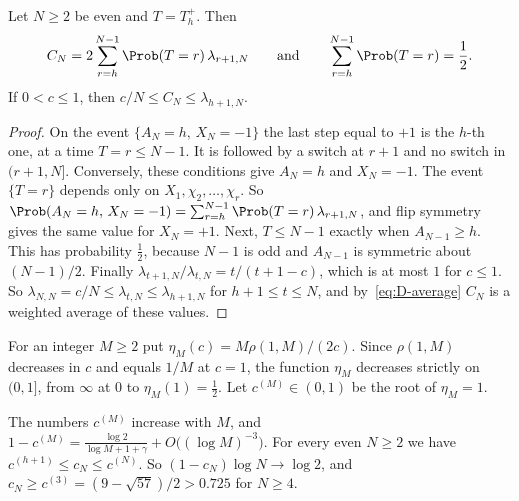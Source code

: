 \begin{lemma}\label{lem:D-average}
Let $N\ge2$ be even and $T=T^+_h$. Then
\begin{equation}\label{eq:D-average}
C_N=2\sum_{r=h}^{N-1}\Prob(T=r)\,\lambda_{r+1,N}\qquad\text{and}\qquad
\sum_{r=h}^{N-1}\Prob(T=r)=\frac12 .
\end{equation}
If $0<c\le1$, then $c/N\le C_N\le\lambda_{h+1,N}$.
\end{lemma}

\begin{proof}
On the event $\{A_N=h,\,X_N=-1\}$ the last step equal to $+1$ is the $h$-th
one, at a time $T=r\le N-1$. It is followed by a switch at $r+1$ and no switch
in $(r+1,N]$. Conversely, these conditions give $A_N=h$ and $X_N=-1$. The
event $\{T=r\}$ depends only on $X_1,\chi_2,\dots,\chi_r$. So
$\Prob(A_N=h,\,X_N=-1)=\sum_{r=h}^{N-1}\Prob(T=r)\,\lambda_{r+1,N}$, and flip
symmetry gives the same value for $X_N=+1$. Next, $T\le N-1$ exactly when
$A_{N-1}\ge h$. This has probability $\frac12$, because $N-1$ is odd and
$A_{N-1}$ is symmetric about $(N-1)/2$. Finally
$\lambda_{t+1,N}/\lambda_{t,N}=t/(t+1-c)$, which is at most $1$ for $c\le1$.
So $\lambda_{N,N}=c/N\le\lambda_{t,N}\le\lambda_{h+1,N}$ for
$h+1\le t\le N$, and by~\eqref{eq:D-average} $C_N$ is a weighted average of
these values.
\end{proof}

For an integer $M\ge2$ put $\eta_M(c)=M\rho(1,M)/(2c)$. Since $\rho(1,M)$
decreases in $c$ and equals $1/M$ at $c=1$, the function $\eta_M$ decreases
strictly on $(0,1]$, from $\infty$ at $0$ to $\eta_M(1)=\frac12$. Let
$c^{(M)}\in(0,1)$ be the root of $\eta_M=1$.

\begin{proposition}[bracket]\label{prop:D-bracket}
The numbers $c^{(M)}$ increase with $M$, and
$1-c^{(M)}=\frac{\log2}{\log M+1+\gamma}+O\bigl((\log M)^{-3}\bigr)$. For
every even $N\ge2$ we have $c^{(h+1)}\le c_N\le c^{(N)}$. So
$(1-c_N)\log N\to\log2$, and $c_N\ge c^{(3)}=(9-\sqrt{57})/2>0.725$ for
$N\ge4$.
\end{proposition}

